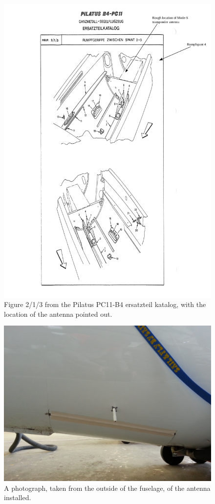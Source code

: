 \documentclass{article}
\begin{document}
\begin{figure}
\includegraphics[width=\textwidth,keepaspectratio]{b4_ersatzteil_katalog_fig_2_1_3_annotated}
\caption{Figure 2/1/3 from the Pilatus PC11-B4 ersatzteil katalog, with the location of the antenna pointed out.}
\label{fig:ersatzteil_antenna}
\end{figure}

\begin{figure}
\includegraphics[width=\textwidth,keepaspectratio]{outside}
\caption{A photograph, taken from the outside of the fuselage, of the antenna installed.}
\label{fig:outside}
\end{figure}
\end{document}
